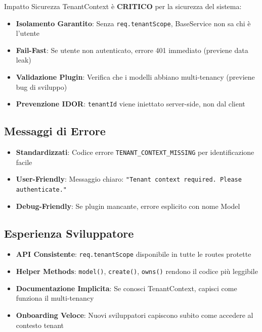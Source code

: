 \documentclass[11pt,a4paper]{article}
\begin{document}
\begin{importantbox}{Impatto Sicurezza}
TenantContext è \textbf{CRITICO} per la sicurezza del sistema:
\begin{itemize}
    \item \textbf{Isolamento Garantito}: Senza \texttt{req.tenantScope}, BaseService non sa chi è l'utente
    \item \textbf{Fail-Fast}: Se utente non autenticato, errore 401 immediato (previene data leak)
    \item \textbf{Validazione Plugin}: Verifica che i modelli abbiano multi-tenancy (previene bug di sviluppo)
    \item \textbf{Prevenzione IDOR}: \texttt{tenantId} viene iniettato server-side, non dal client
\end{itemize}
\end{importantbox}

\subsection{Messaggi di Errore}

\begin{itemize}
    \item \textbf{Standardizzati}: Codice errore \texttt{TENANT\_CONTEXT\_MISSING} per identificazione facile
    \item \textbf{User-Friendly}: Messaggio chiaro: \texttt{"Tenant context required. Please authenticate."}
    \item \textbf{Debug-Friendly}: Se plugin mancante, errore esplicito con nome Model
\end{itemize}

\subsection{Esperienza Sviluppatore}

\begin{itemize}
    \item \textbf{API Consistente}: \texttt{req.tenantScope} disponibile in tutte le routes protette
    \item \textbf{Helper Methods}: \texttt{model()}, \texttt{create()}, \texttt{owns()} rendono il codice più leggibile
    \item \textbf{Documentazione Implicita}: Se conosci TenantContext, capisci come funziona il multi-tenancy
    \item \textbf{Onboarding Veloce}: Nuovi sviluppatori capiscono subito come accedere al contesto tenant
\end{itemize}
\end{document}
